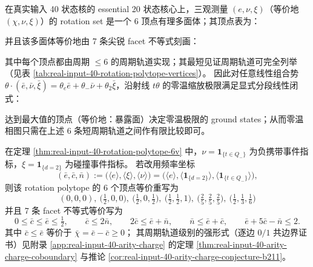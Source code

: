 \begin{theorem}\label{thm:real-input-40-rotation-polytope-6v}
在真实输入 40 状态核的 essential 20 状态核心上，三观测量 \((e,\nu,\xi)\)（等价地 \((\chi,\nu,\xi)\)）的 rotation set 是一个 6 顶点有理多面体；其顶点表为：

并且该多面体等价地由 7 条尖锐 facet 不等式刻画：

其中每个顶点都由周期 \(\le 6\) 的周期轨道实现；其最短见证周期轨道可完全列举（见表 \ref{tab:real-input-40-rotation-polytope-vertices}）。
因此对任意线性组合势 \(\theta\cdot(\bar e,\bar\nu,\bar\xi)=\theta_e\bar e+\theta_-\bar\nu+\theta_2\bar\xi\)，沿射线 \(t\theta\) 的零温缩放极限满足显式分段线性闭式：

达到最大值的顶点（等价地：暴露面）决定零温极限的 ground states；从而零温相图只需在上述 6 条短周期轨道之间作有限比较即可。
\end{theorem}

\begin{remark}\label{rem:real-input-40-rotation-polytope-ecn}
在定理 \ref{thm:real-input-40-rotation-polytope-6v} 中，\(\nu=\mathbf{1}_{\{t\in Q_-\}}\) 为负携带事件指标，\(\xi=\mathbf{1}_{\{d=2\}}\) 为碰撞事件指标。
若改用频率坐标
\[
(\bar e,\bar c,\bar n)
:=\bigl(\langle e\rangle,\langle\xi\rangle,\langle\nu\rangle\bigr)
=\bigl(\langle e\rangle,\langle\mathbf{1}_{\{d=2\}}\rangle,\langle\mathbf{1}_{\{t\in Q_-\}}\rangle\bigr),
\]
则该 rotation polytope 的 6 个顶点等价重写为
\[
\boxed{
(0,0,0),\
\Big(\tfrac12,0,0\Big),\
\Big(\tfrac12,0,\tfrac12\Big),\
\Big(\tfrac12,\tfrac12,1\Big),\
\Big(\tfrac25,\tfrac25,\tfrac25\Big),\
\Big(\tfrac12,\tfrac13,\tfrac16\Big)
}
\]
并且 7 条 facet 不等式等价写为
\[
\boxed{
0\le \bar c\le \bar e \le \tfrac12,\qquad
\bar c \le 2\bar n,\qquad
2\bar c \le \bar e+\bar n,\qquad
\bar n \le \bar e+\bar c,\qquad
\bar e+5\bar c-\bar n \le 2.
}
\]
其中 \(\bar c\le\bar e\) 等价于 \(\bar\chi=\bar e-\bar c\ge 0\)；
其周期轨道级别的强形式（逐边 \(0/1\) 共边界证书）见附录 \ref{app:real-input-40-arity-charge} 的定理 \ref{thm:real-input-40-arity-charge-coboundary} 与推论 \ref{cor:real-input-40-arity-charge-conjecture-b211}。
\end{remark}




